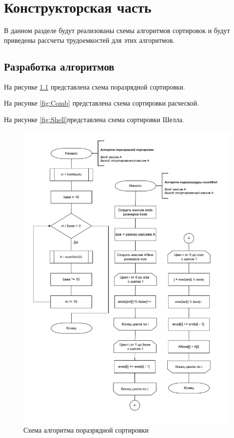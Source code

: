\chapter{Конструкторская часть}
В данном разделе будут реализованы схемы алгоритмов сортировок и будут приведены рассчеты трудоемкостей для этих алгоритмов.

\section{Разработка алгоритмов}
На рисунке \ref{fig:Radix} представлена схема поразрядной сортировки.

На рисунке \ref{fig:Comb} представлена схема сортировки расческой.

На рисунке \ref{fig:Shell}представлена схема сортировки Шелла.

\begin{figure}[h]
	\centering
	\includegraphics[height=0.9\textheight, page=1]{img/algorithms.pdf}
	\caption{Схема алгоритма поразрядной сортировки}
	\label{fig:Radix}
\end{figure}

